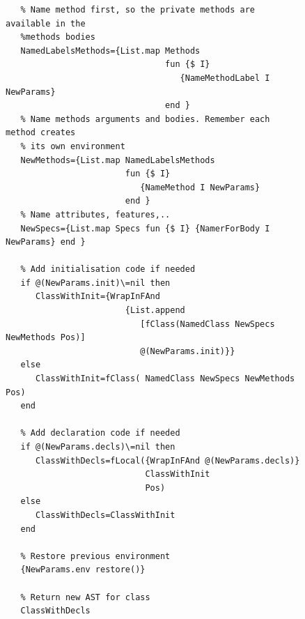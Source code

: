 \documentclass[a4paper]{memoir}
\begin{document}
\begin{appendices}
\begin{figure}[H]
\begin{lstlisting}
   % Name method first, so the private methods are available in the 
   %methods bodies
   NamedLabelsMethods={List.map Methods 
                                fun {$ I} 
                                   {NameMethodLabel I NewParams} 
                                end }
   % Name methods arguments and bodies. Remember each method creates
   % its own environment
   NewMethods={List.map NamedLabelsMethods 
                        fun {$ I} 
                           {NameMethod I NewParams} 
                        end }
   % Name attributes, features,..
   NewSpecs={List.map Specs fun {$ I} {NamerForBody I NewParams} end }

   % Add initialisation code if needed
   if @(NewParams.init)\=nil then
      ClassWithInit={WrapInFAnd 
                        {List.append 
                           [fClass(NamedClass NewSpecs NewMethods Pos)] 
                           @(NewParams.init)}}
   else
      ClassWithInit=fClass( NamedClass NewSpecs NewMethods Pos)
   end

   % Add declaration code if needed
   if @(NewParams.decls)\=nil then
      ClassWithDecls=fLocal({WrapInFAnd @(NewParams.decls)} 
                            ClassWithInit 
                            Pos)
   else
      ClassWithDecls=ClassWithInit
   end

   % Restore previous environment
   {NewParams.env restore()}

   % Return new AST for class
   ClassWithDecls
\end{lstlisting}
\end{figure}







\end{appendices}
\end{document}
